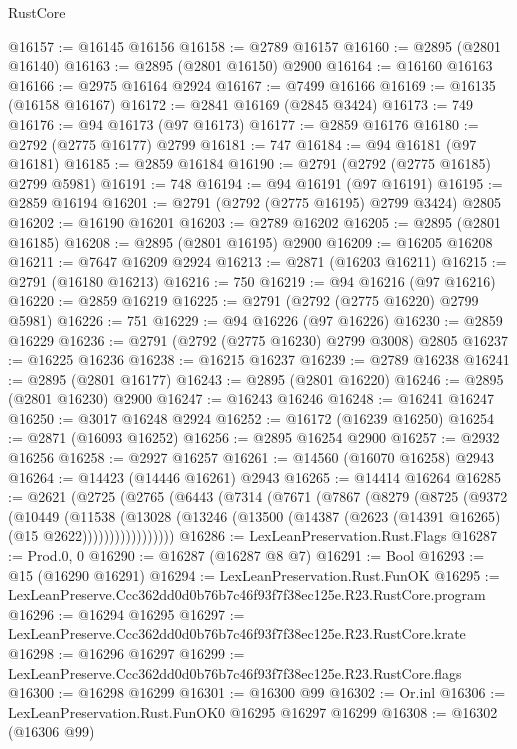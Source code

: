 \begin{lexlean}{RustCore}
\begin{coremodule}
@16157 := @16145 @16156
@16158 := @2789 @16157
@16160 := @2895 (@2801 @16140)
@16163 := @2895 (@2801 @16150) @2900
@16164 := @16160 @16163
@16166 := @2975 @16164 @2924
@16167 := @7499 @16166
@16169 := @16135 (@16158 @16167)
@16172 := @2841 @16169 (@2845 @3424)
@16173 := 749
@16176 := @94 @16173 (@97 @16173)
@16177 := @2859 @16176
@16180 := @2792 (@2775 @16177) @2799
@16181 := 747
@16184 := @94 @16181 (@97 @16181)
@16185 := @2859 @16184
@16190 := @2791 (@2792 (@2775 @16185) @2799 @5981)
@16191 := 748
@16194 := @94 @16191 (@97 @16191)
@16195 := @2859 @16194
@16201 := @2791 (@2792 (@2775 @16195) @2799 @3424) @2805
@16202 := @16190 @16201
@16203 := @2789 @16202
@16205 := @2895 (@2801 @16185)
@16208 := @2895 (@2801 @16195) @2900
@16209 := @16205 @16208
@16211 := @7647 @16209 @2924
@16213 := @2871 (@16203 @16211)
@16215 := @2791 (@16180 @16213)
@16216 := 750
@16219 := @94 @16216 (@97 @16216)
@16220 := @2859 @16219
@16225 := @2791 (@2792 (@2775 @16220) @2799 @5981)
@16226 := 751
@16229 := @94 @16226 (@97 @16226)
@16230 := @2859 @16229
@16236 := @2791 (@2792 (@2775 @16230) @2799 @3008) @2805
@16237 := @16225 @16236
@16238 := @16215 @16237
@16239 := @2789 @16238
@16241 := @2895 (@2801 @16177)
@16243 := @2895 (@2801 @16220)
@16246 := @2895 (@2801 @16230) @2900
@16247 := @16243 @16246
@16248 := @16241 @16247
@16250 := @3017 @16248 @2924
@16252 := @16172 (@16239 @16250)
@16254 := @2871 (@16093 @16252)
@16256 := @2895 @16254 @2900
@16257 := @2932 @16256
@16258 := @2927 @16257
@16261 := @14560 (@16070 @16258) @2943
@16264 := @14423 (@14446 @16261) @2943
@16265 := @14414 @16264
@16285 := @2621
    (@2725
      (@2765
        (@6443
          (@7314
            (@7671
              (@7867
                (@8279
                  (@8725
                    (@9372
                      (@10449
                        (@11538
                          (@13028
                            (@13246
                              (@13500 (@14387 (@2623 (@14391 @16265) (@15 @2622)))))))))))))))))
@16286 := LexLeanPreservation.Rust.Flags
@16287 := Prod.{0, 0}
@16290 := @16287 (@16287 @8 @7)
@16291 := Bool
@16293 := @15 (@16290 @16291)
@16294 := LexLeanPreservation.Rust.FunOK
@16295 := LexLeanPreserve.Ccc362dd0d0b76b7c46f93f7f38ec125e.R23.RustCore.program
@16296 := @16294 @16295
@16297 := LexLeanPreserve.Ccc362dd0d0b76b7c46f93f7f38ec125e.R23.RustCore.krate
@16298 := @16296 @16297
@16299 := LexLeanPreserve.Ccc362dd0d0b76b7c46f93f7f38ec125e.R23.RustCore.flags
@16300 := @16298 @16299
@16301 := @16300 @99
@16302 := Or.inl
@16306 := LexLeanPreservation.Rust.FunOK0 @16295 @16297 @16299
@16308 := @16302 (@16306 @99)

\end{coremodule}
\end{lexlean}
